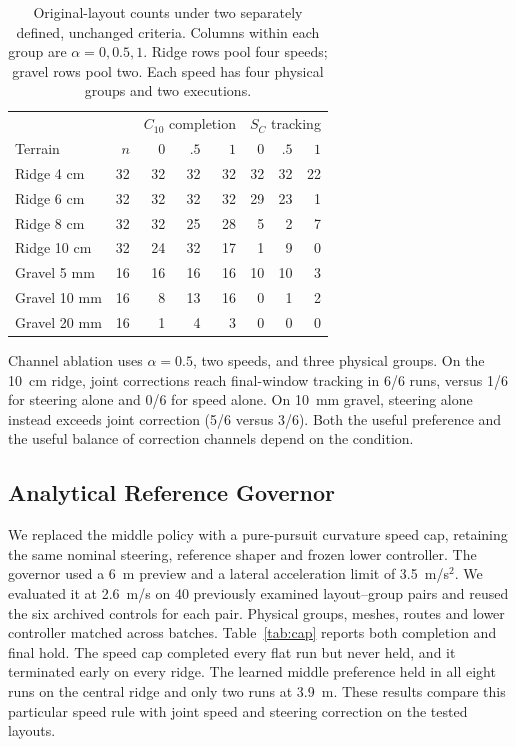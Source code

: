 \documentclass[journal]{IEEEtran}
\begin{document}
\begin{table}[t]\centering\footnotesize
\caption{Original-layout counts under two separately defined, unchanged criteria. Columns within each group are $\alpha=0,0.5,1$. Ridge rows pool four speeds; gravel rows pool two. Each speed has four physical groups and two executions.}\label{tab:terraincounts}
\begin{tabular}{@{}lrrrrrrr@{}}\toprule
& &\multicolumn{3}{c}{$C_{10}$ completion}&\multicolumn{3}{c}{$S_C$ tracking}\\
Terrain & $n$ & $0$ & $.5$ & $1$ & $0$ & $.5$ & $1$\\\midrule
Ridge 4 cm &32&32&32&32&32&32&22\\
Ridge 6 cm &32&32&32&32&29&23&1\\
Ridge 8 cm &32&32&25&28&5&2&7\\
Ridge 10 cm &32&24&32&17&1&9&0\\
Gravel 5 mm &16&16&16&16&10&10&3\\
Gravel 10 mm &16&8&13&16&0&1&2\\
Gravel 20 mm &16&1&4&3&0&0&0\\\bottomrule
\end{tabular}
\end{table}

Channel ablation uses $\alpha=0.5$, two speeds, and three physical groups. On the 10~cm ridge, joint corrections reach final-window tracking in 6/6 runs, versus 1/6 for steering alone and 0/6 for speed alone. On 10~mm gravel, steering alone instead exceeds joint correction (5/6 versus 3/6). Both the useful preference and the useful balance of correction channels depend on the condition.

\subsection{Analytical Reference Governor}
We replaced the middle policy with a pure-pursuit curvature speed cap, retaining the same nominal steering, reference shaper and frozen lower controller. The governor used a 6~m preview and a lateral acceleration limit of 3.5~m/s$^2$. We evaluated it at 2.6~m/s on 40 previously examined layout--group pairs and reused the six archived controls for each pair. Physical groups, meshes, routes and lower controller matched across batches. Table~\ref{tab:cap} reports both completion and final hold. The speed cap completed every flat run but never held, and it terminated early on every ridge. The learned middle preference held in all eight runs on the central ridge and only two runs at 3.9~m. These results compare this particular speed rule with joint speed and steering correction on the tested layouts.
\end{document}
